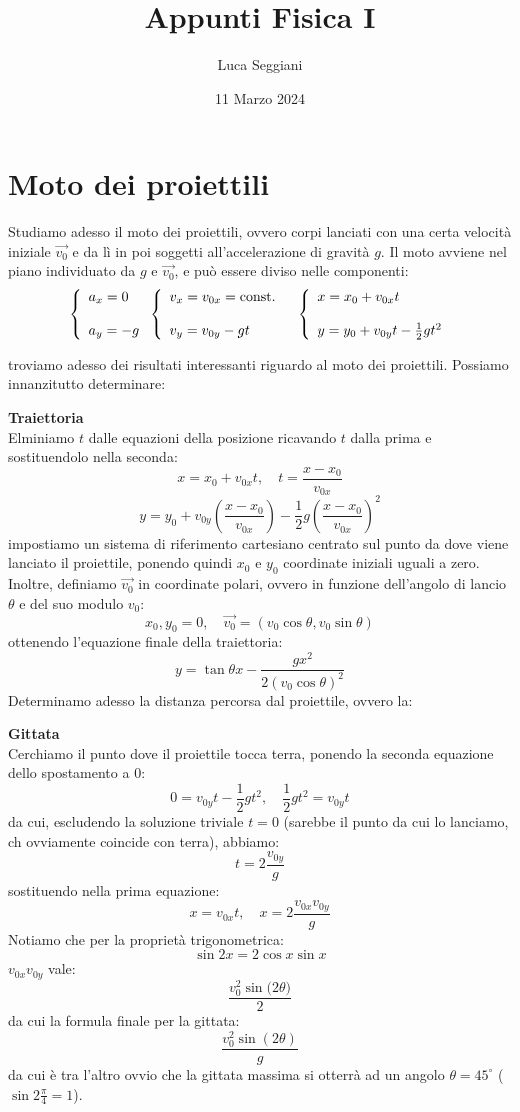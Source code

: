 \documentclass[a4paper,12pt]{article}
\title{Appunti Fisica I}
\author{Luca Seggiani}
\date{11 Marzo 2024}
\begin{document}
\maketitle
\section{Moto dei proiettili}
Studiamo adesso il moto dei proiettili, ovvero corpi lanciati con una certa velocità iniziale $\vec{v_0}$ e
da lì in poi soggetti all'accelerazione di gravità $g$. Il moto avviene nel piano individuato da $g$ e $\vec{v_0}$,
e può essere diviso nelle componenti:
$$
\begin{aligned}
\left\{\begin{array}{l}
  a_x = 0 \cr \\
  a_y = -g 
\end{array}\right.
& 
\left\{\begin{array}{l}
  v_x = v_{0x} = \mathrm{const.} \cr \\
  v_y = v_{0y} - gt 
\end{array}\right.
&
\left\{\begin{array}{l}
  x = x_0 + v_{0x}t \cr \\
  y = y_0 + v_{0y}t - \frac{1}{2}gt^2 
\end{array}\right.
\end{aligned}
$$

troviamo adesso dei risultati interessanti riguardo al moto dei proiettili. Possiamo innanzitutto
determinare:
\par\smallskip
\textbf{Traiettoria} \\
Elminiamo $t$ dalle equazioni della posizione ricavando $t$ dalla prima e sostituendolo nella seconda:
$$ x = x_0 + v_{0x}t, \quad t = \frac{x-x_0}{v_{0x}} $$
$$ y = y_0 + v_{0y}(\frac{x-x_0}{v_{0x}})-\frac{1}{2}g(\frac{x-x_0}{v_{0x}})^2 $$
impostiamo un sistema di riferimento cartesiano centrato sul punto da dove viene lanciato il proiettile,
ponendo quindi $x_0$ e $y_0$ coordinate iniziali uguali a zero. Inoltre, definiamo $\vec{v_0}$ in coordinate polari,
ovvero in funzione dell'angolo di lancio $\theta$ e del suo modulo $v_0$:
$$ x_0, y_0 = 0, \quad \vec{v_0} = (v_0\cos{\theta}, v_0\sin{\theta}) $$
ottenendo l'equazione finale della traiettoria:
$$ y = \tan{\theta}x - \frac{gx^2}{2(v_0\cos{\theta})^2}$$
Determinamo adesso la distanza percorsa dal proiettile, ovvero la:
\par\smallskip
\textbf{Gittata} \\
Cerchiamo il punto dove il proiettile tocca terra, ponendo la seconda equazione dello spostamento a 0:
$$ 0 = v_{0y}t - \frac{1}{2}gt^2, \quad \frac{1}{2}gt^2 = v_{0y}t $$
da cui, escludendo la soluzione triviale $t = 0$ (sarebbe il punto da cui lo lanciamo, ch ovviamente coincide con terra), abbiamo:
$$ t = 2\frac{v_{0y}}{g} $$
sostituendo nella prima equazione:
$$ x = v_{0x}t, \quad x = 2\frac{v_{0x}v_{0y}}{g} $$
Notiamo che per la proprietà trigonometrica:
$$ \sin{2x} = 2\cos{x}\sin{x} $$
$v_{0x}v_{0y}$ vale:
$$ \frac{v_0^2\sin{(2\theta})}{2} $$
da cui la formula finale per la gittata:
$$ \frac{v_0^2 \sin{(2\theta)}}{g} $$
da cui è tra l'altro ovvio che la gittata massima si otterrà ad un angolo $\theta = 45^\circ$ ($\sin{2\frac{\pi}{4}} = 1$).
\end{document}

